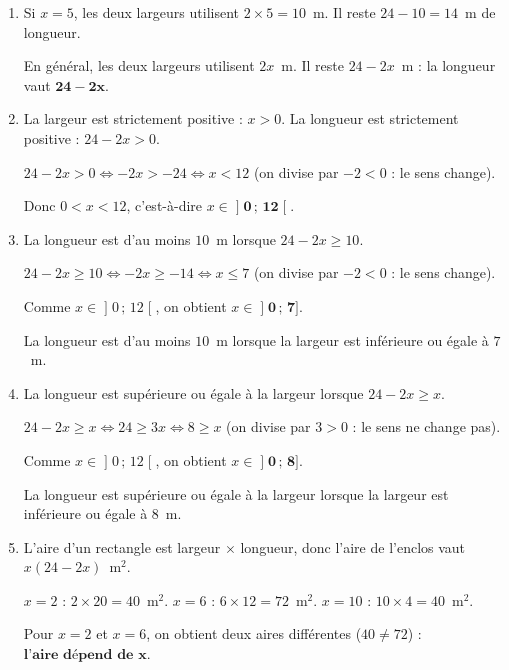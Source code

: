 \documentclass[12pt,a4paper]{article}
\newcommand{\exercice}[1]{%
  \vspace{0.5em}
  \noindent\exobox{Exercice #1}\par
  \vspace{0.6em}
}
\newcommand{\res}[1]{\ensuremath{\mathbf{#1}}}
\begin{document}
\exercice{2}
\begin{enumerate}
	\item Si $x=5$, les deux largeurs utilisent $2\times 5=10$~m. Il reste $24-10=14$~m de longueur.

	En général, les deux largeurs utilisent $2x$~m. Il reste $24-2x$~m : la longueur vaut \res{24-2x}.
	\item La largeur est strictement positive : $x>0$. La longueur est strictement positive : $24-2x>0$.

	$24-2x>0 \iff -2x>-24 \iff x<12$ \quad (on divise par $-2<0$ : le sens change).

	Donc $0<x<12$, c'est-à-dire $x\in\res{\mathopen{]}0\,;\,12\mathclose{[}}$.
	\item La longueur est d'au moins $10$~m lorsque $24-2x\geqslant 10$.

	$24-2x\geqslant 10 \iff -2x\geqslant -14 \iff x\leqslant 7$ \quad (on divise par $-2<0$ : le sens change).

	Comme $x\in\mathopen{]}0\,;\,12\mathclose{[}$, on obtient $x\in\res{\mathopen{]}0\,;\,7]}$.

	La longueur est d'au moins $10$~m lorsque la largeur est inférieure ou égale à $7$~m.
	\item La longueur est supérieure ou égale à la largeur lorsque $24-2x\geqslant x$.

	$24-2x\geqslant x \iff 24\geqslant 3x \iff 8\geqslant x$ \quad (on divise par $3>0$ : le sens ne change pas).

	Comme $x\in\mathopen{]}0\,;\,12\mathclose{[}$, on obtient $x\in\res{\mathopen{]}0\,;\,8]}$.

	La longueur est supérieure ou égale à la largeur lorsque la largeur est inférieure ou égale à $8$~m.
	\item L'aire d'un rectangle est largeur $\times$ longueur, donc l'aire de l'enclos vaut $x(24-2x)$~m$^2$.

	$x=2$ : $2\times 20=40$~m$^2$. \quad $x=6$ : $6\times 12=72$~m$^2$. \quad $x=10$ : $10\times 4=40$~m$^2$.

	Pour $x=2$ et $x=6$, on obtient deux aires différentes ($40\neq 72$) : \res{\text{l'aire dépend de } x}.
\end{enumerate}
\fi
\end{document}
